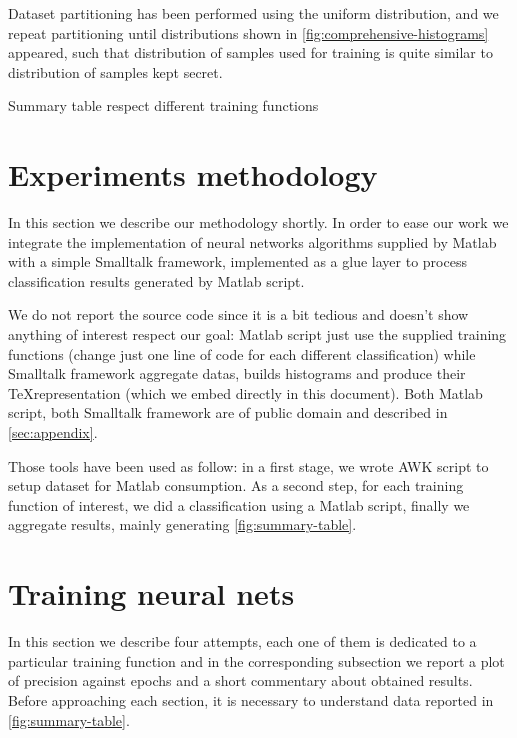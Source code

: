 \documentclass[10pt,a4paper]{article}
\begin{document}
    Dataset partitioning has been performed using the uniform distribution, and we 
    repeat partitioning until distributions shown in \autoref{fig:comprehensive-histograms}
    appeared, such that distribution of samples used for training is quite similar
    to distribution of samples kept secret.

    \begin{table}
      \begin{adjustwidth}{-4cm}{}
            
      \end{adjustwidth}
      \caption{Summary table respect different training functions}
      \label{fig:summary-table}
    \end{table}

    \section{Experiments methodology}
    In this section we describe our methodology shortly. In order to ease 
    our work we integrate the implementation of neural networks algorithms
    supplied by Matlab with a simple Smalltalk framework, implemented as a 
    glue layer to process classification results generated by Matlab script.
    
    We do not report the source code since it is a bit tedious and doesn't show
    anything of interest respect our goal: Matlab script just use the supplied
    training functions (change just one line of code for each different classification)
    while Smalltalk framework aggregate datas, builds histograms and produce their
    \TeX representation (which we embed directly in this document). Both Matlab script,
    both Smalltalk framework are of public domain and described in \autoref{sec:appendix}.

    Those tools have been used as follow: in a first stage, we wrote AWK script 
    to setup dataset for Matlab consumption.
    As a second step, for each training function of interest, we did a classification
    using a Matlab script, finally we aggregate results, mainly generating \autoref{fig:summary-table}.

    \section{Training neural nets}
    In this section we describe four attempts, each one of them is dedicated
    to a particular training function and in the corresponding subsection 
    we report a plot of precision against epochs and a short commentary about 
    obtained results. Before approaching each section, it is necessary to understand
    data reported in \autoref{fig:summary-table}.
\end{document}
